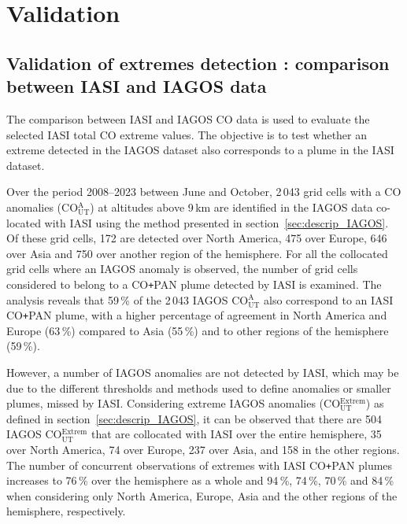\documentclass[acp, manuscript]{copernicus}
\begin{document}
\section{Validation}{\label{comparison_chap4}}


\subsection{Validation of extremes detection : comparison between IASI and IAGOS data}\label{sec:IAGOS_chap4}


The comparison between IASI and IAGOS CO data is used  to evaluate the selected IASI total CO extreme values. The objective is to test whether an extreme detected in the IAGOS dataset also corresponds to a plume in the IASI dataset.



Over the period 2008--2023 between June and October, 2\,043 grid cells with a CO anomalies (CO$_{\text{UT}}^{\text{A}}$) at altitudes above 9\,km are identified in the IAGOS data co-located with IASI using the method presented in section~\ref{sec:descrip_IAGOS}. Of these grid cells, 172 are detected over North America, 475 over Europe, 646 over Asia and 750 over another region of the hemisphere. For all the collocated grid cells where an IAGOS anomaly is observed, the number of grid cells considered to belong to a CO\texttt{+}PAN plume detected by IASI is examined. The analysis reveals that 59\,\% of the 2\,043 IAGOS CO$_{\text{UT}}^{\text{A}}$ also correspond to an IASI CO\texttt{+}PAN plume, with a higher percentage of agreement in North America and Europe (63\,\%) compared to Asia (55\,\%) and to other regions of the hemisphere (59\,\%). 


However, a number of IAGOS anomalies are not detected by IASI, which may be due to the different thresholds and methods used to define anomalies or smaller plumes, missed by IASI. Considering extreme IAGOS anomalies (CO$_{\text{UT}}^{\text{Extrem}}$) as defined in section~\ref{sec:descrip_IAGOS}, it can be observed that there are 504 IAGOS CO$_{\text{UT}}^{\text{Extrem}}$ that are collocated with IASI over the entire hemisphere, 35 over North America, 74 over Europe, 237 over Asia, and 158 in the other regions. The number of concurrent observations of extremes with IASI CO\texttt{+}PAN plumes increases to 76\,\% over the hemisphere as a whole and 94\,\%, 74\,\%, 70\,\% and 84\,\% when considering only North America, Europe, Asia and the other regions of the hemisphere, respectively.
\end{document}

